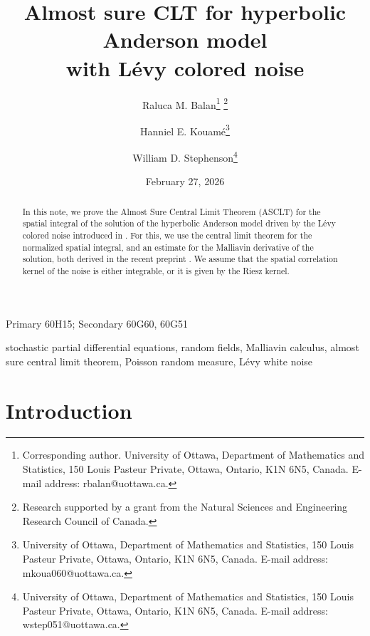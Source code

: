 \documentclass[12pt]{article}
\begin{document}
\title{Almost sure CLT for hyperbolic Anderson model \\
with L\'evy colored noise}

\author{Raluca M. Balan\footnote{Corresponding author. University of Ottawa, Department of Mathematics and Statistics, 150 Louis Pasteur Private, Ottawa, Ontario, K1N 6N5, Canada. E-mail address: rbalan@uottawa.ca.} \footnote{Research supported by a grant from the Natural Sciences and Engineering Research Council of Canada.}
\and
Hanniel E. Kouam\'e\footnote{University of Ottawa, Department of Mathematics and Statistics, 150 Louis Pasteur Private, Ottawa, Ontario, K1N 6N5, Canada. E-mail address: mkoua060@uottawa.ca.}
\and
William D. Stephenson\footnote{University of Ottawa, Department of Mathematics and Statistics, 150 Louis Pasteur Private, Ottawa, Ontario, K1N 6N5, Canada. E-mail address: wstep051@uottawa.ca.}
}

\date{February 27, 2026}
\maketitle

\begin{abstract}
\noindent In this note, we prove the Almost Sure Central Limit Theorem (ASCLT) for the spatial integral of the solution of the hyperbolic Anderson model driven by the L\'evy colored noise introduced in \cite{B15}. For this, we
use the central limit theorem for the normalized spatial integral, and an estimate for the Malliavin derivative of the solution, both derived in the recent preprint \cite{BS26}. We assume that the spatial correlation kernel of the noise is either integrable, or it is given by the Riesz kernel.
\end{abstract}

 Primary 60H15; Secondary 60G60, 60G51

\vspace{1mm}

 stochastic partial differential equations, random fields, Malliavin calculus, almost sure central limit theorem, Poisson random measure, L\'evy white noise

\pagebreak






\section{Introduction}
\end{document}
